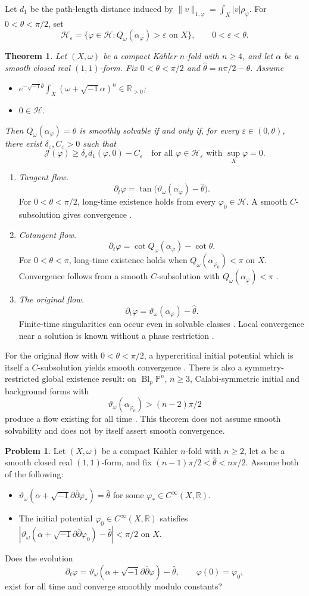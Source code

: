 \documentclass[12pt,reqno]{amsart}
\numberwithin{equation}{section}
\theoremstyle{plain}
\newcommand{\recallheading}{Theorem}
\newtheorem*{recalledtheorem}{\recallheading}
\newenvironment{theoremrecall}[1]{%
 \renewcommand{\recallheading}{Theorem~\ref{#1} (recalled)}%
 \begin{recalledtheorem}%
}{\end{recalledtheorem}}
\theoremstyle{definition}
\newtheorem{problem}[theorem]{Problem}
\newcommand{\ddbar}{\sqrt{-1}\partial\overline{\partial}}
\newcommand{\cH}{\mathcal H}
\newcommand{\R}{\mathbb R}
\newcommand{\bbP}{\mathbb P}
\newcommand{\PropernessStatement}{%
Let $(X,\omega)$ be a compact K\"ahler $n$-fold with $n\geq4$, and
let $\alpha$ be a smooth closed real $(1,1)$-form. Fix
$0<\theta<\pi/2$ and $\widehat\theta=n\pi/2-\theta$. Assume
\begin{itemize}
\item $e^{-\sqrt{-1}\widehat\theta}\int_X(\omega+\sqrt{-1}\alpha)^n
\in\R_{>0}$;
\item $0\in\cH$.
\end{itemize}
Then $Q_\omega(\alpha_\varphi)=\theta$ is smoothly solvable if and
only if, for every $\varepsilon\in(0,\theta)$, there exist
$\delta_\varepsilon,C_\varepsilon>0$ such that
\[
 \mathcal J(\varphi)\geq\delta_\varepsilon d_1(\varphi,0)-C_\varepsilon
 \quad\text{for all }\varphi\in\cH_\varepsilon
 \text{ with }\sup_X\varphi=0.
\]
}
\begin{document}
Let $d_1$ be the path-length distance induced by
$\|v\|_{1,\varphi}=\int_X|v|\rho_\varphi$. For $0<\theta<\pi/2$, set
\[
 \cH_\varepsilon=\{\varphi\in\cH:
 Q_\omega(\alpha_\varphi)>\varepsilon\text{ on }X\},
 \qquad 0<\varepsilon<\theta.
\]

\begin{theoremrecall}{thm-properness}
\PropernessStatement
\end{theoremrecall}

\begin{enumerate}
\item \emph{Tangent flow.}
\[
 \partial_t\varphi=
 \tan\bigl(\vartheta_\omega(\alpha_\varphi)-\widehat\theta\bigr).
\]
For $0<\theta<\pi/2$, long-time existence holds from every
$\varphi_0\in\cH$. A smooth $C$-subsolution gives convergence
\cite[Theorem 1.4]{Tak20}.

\item \emph{Cotangent flow.}
\[
 \partial_t\varphi=\cot Q_\omega(\alpha_\varphi)-\cot\theta.
\]
For $0<\theta<\pi$, long-time existence holds when
$Q_\omega(\alpha_{\varphi_0})<\pi$ on $X$. Convergence follows from a
smooth $C$-subsolution with $Q_\omega(\alpha_{\underline\varphi})<\pi$
\cite[Theorems 1.2--1.3]{FYZ25}.

\item \emph{The original flow.}
\[
 \partial_t\varphi=\vartheta_\omega(\alpha_\varphi)-\widehat\theta.
\]
Finite-time singularities can occur even in solvable classes
\cite{CJ25}. Local convergence near a solution is known without a
phase restriction \cite{HJ20}.
\end{enumerate}

For the original flow with $0<\theta<\pi/2$, a hypercritical initial
potential which is itself a $C$-subsolution yields smooth convergence
\cite[Theorem 1.3, citing Collins--Jacob--Yau, Remark 7.4]{Tak20}.
There is also a symmetry-restricted global existence result: on
$\operatorname{Bl}_p\bbP^n$, $n\geq3$, Calabi-symmetric initial and
background forms with
\[
 \vartheta_\omega(\alpha_{\varphi_0})>(n-2)\pi/2
\]
produce a flow existing for all time \cite[Theorem 1.2]{CJ25}.
This theorem does not assume smooth solvability and does not by itself
assert smooth convergence.

\begin{problem}\label{problem-original-flow-basin}
Let $(X,\omega)$ be a compact K\"ahler $n$-fold with $n\geq2$, let
$\alpha$ be a smooth closed real $(1,1)$-form, and fix
$(n-1)\pi/2<\widehat\theta<n\pi/2$. Assume both of the following:
\begin{itemize}
\item $\vartheta_\omega(\alpha+\ddbar\varphi_*)=\widehat\theta$ for
some $\varphi_*\in C^\infty(X,\R)$.
\item The initial potential $\varphi_0\in C^\infty(X,\R)$ satisfies
$|\vartheta_\omega(\alpha+\ddbar\varphi_0)-\widehat\theta|<\pi/2$
on $X$.
\end{itemize}
Does the evolution
\[
 \partial_t\varphi=\vartheta_\omega(\alpha+\ddbar\varphi)-\widehat\theta,
 \qquad \varphi(0)=\varphi_0,
\]
exist for all time and converge smoothly modulo constants?
\end{problem}
\end{document}

